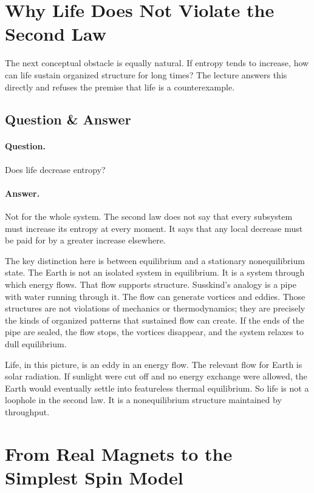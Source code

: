 \section{Why Life Does Not Violate the Second Law}

The next conceptual obstacle is equally natural. If entropy tends to increase, how can life sustain organized structure for long times? The lecture answers this directly and refuses the premise that life is a counterexample.

\subsection{Question \& Answer}

\paragraph{Question.} Does life decrease entropy?

\paragraph{Answer.} Not for the whole system. The second law does not say that every subsystem must increase its entropy at every moment. It says that any local decrease must be paid for by a greater increase elsewhere.

The key distinction here is between equilibrium and a stationary nonequilibrium state. The Earth is not an isolated system in equilibrium. It is a system through which energy flows. That flow supports structure. Susskind's analogy is a pipe with water running through it. The flow can generate vortices and eddies. Those structures are not violations of mechanics or thermodynamics; they are precisely the kinds of organized patterns that sustained flow can create. If the ends of the pipe are sealed, the flow stops, the vortices disappear, and the system relaxes to dull equilibrium.

Life, in this picture, is an eddy in an energy flow. The relevant flow for Earth is solar radiation. If sunlight were cut off and no energy exchange were allowed, the Earth would eventually settle into featureless thermal equilibrium. So life is not a loophole in the second law. It is a nonequilibrium structure maintained by throughput.

\section{From Real Magnets to the Simplest Spin Model}

